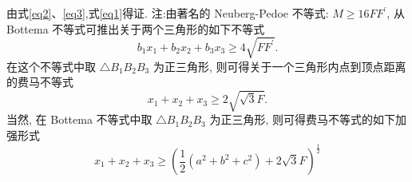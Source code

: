由式\ref{eq2}、\ref{eq3},式\ref{eq1}得证.
注:由著名的 Neuberg-Pedoe 不等式: $M \geqslant 16 F F^{\prime}$, 从 Bottema 不等式可推出关于两个三角形的如下不等式
$$
b_1 x_1+b_2 x_2+b_3 x_3 \geqslant 4 \sqrt{F F^{\prime}} .
$$
在这个不等式中取 $\triangle B_1 B_2 B_3$ 为正三角形, 则可得关于一个三角形内点到顶点距离的费马不等式
$$
x_1+x_2+x_3 \geqslant 2 \sqrt{\sqrt{3} F} .
$$
当然, 在 Bottema 不等式中取 $\triangle B_1 B_2 B_3$ 为正三角形, 则可得费马不等式的如下加强形式
$$
x_1+x_2+x_3 \geqslant\left(\frac{1}{2}\left(a^2+b^2+c^2\right)+2 \sqrt{3} F\right)^{\frac{1}{2}}
$$


